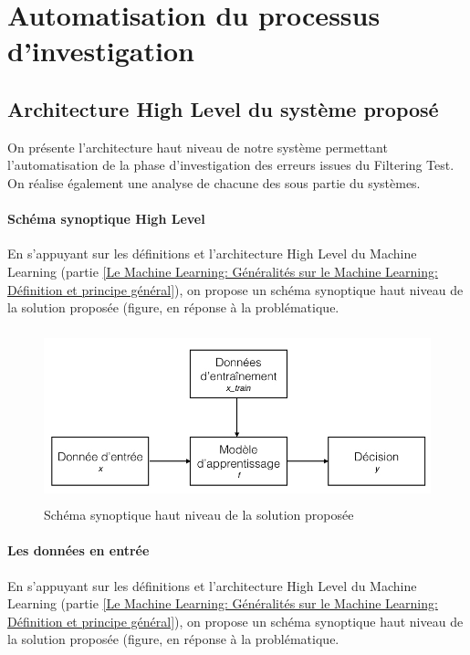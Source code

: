 \chapter{Automatisation du processus d'investigation}
\label{Automatisation du processus d'investigation}
\thispagestyle{fancy}


\section{Architecture High Level du système proposé}
\label{Automatisation du processus d'investigation: Achitecture High Level du système proposé}
On présente l'architecture haut niveau de notre système permettant l'automatisation de la phase d'investigation des erreurs issues du Filtering Test. On réalise également une analyse de chacune des sous partie du systèmes.

\subsubsection{Schéma synoptique High Level}
\label{Automatisation du processus d'investigation: Achitecture High Level du système proposé: Schéma synoptique High Level}
En s'appuyant sur les définitions et l'architecture High Level du Machine Learning (partie \ref{Le Machine Learning: Généralités sur le Machine Learning: Définition et principe général}), on propose un schéma synoptique haut niveau de la solution proposée (figure, en réponse à la problématique. 

\begin{figure}[h]
	\centering\includegraphics[height=5cm]{images/ML_high_level.jpeg}
	\caption{Schéma synoptique haut niveau de la solution proposée}
	\label{fig:Schéma synoptique haut niveau de la solution proposée}
\end{figure}

\subsubsection{Les données en entrée}
\label{Automatisation du processus d'investigation: Achitecture High Level du système proposé: Schéma synoptique High Level}
En s'appuyant sur les définitions et l'architecture High Level du Machine Learning (partie \ref{Le Machine Learning: Généralités sur le Machine Learning: Définition et principe général}), on propose un schéma synoptique haut niveau de la solution proposée (figure, en réponse à la problématique. 

